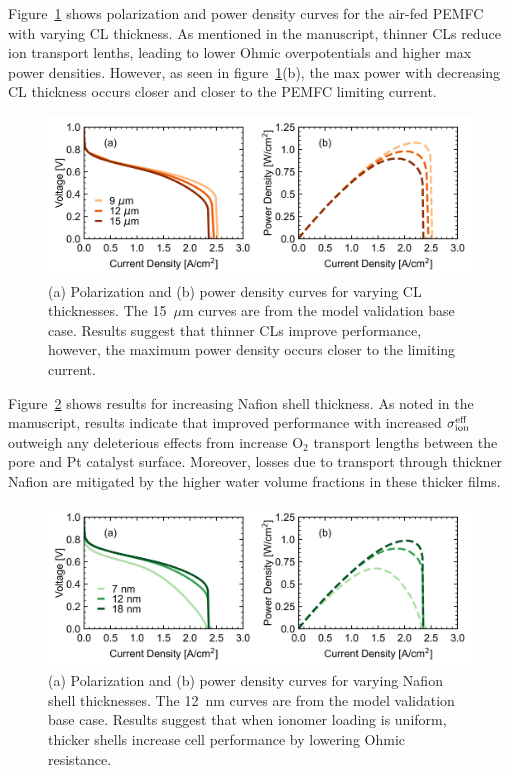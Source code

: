 \documentclass[final,3p,times,onecolumn]{elsarticle}    %
\begin{document}
Figure~\ref{fig:CL-thickness-study} shows polarization and power density curves for the air-fed PEMFC with varying CL thickness.  As mentioned in the manuscript, thinner CLs reduce ion transport lenths, leading to lower Ohmic overpotentials and higher max power densities.  However, as seen in figure~\ref{fig:CL-thickness-study}(b), the max power with decreasing CL thickness occurs closer and closer to the PEMFC limiting current.
\begin{figure}[H]
    \centering
    \includegraphics[width=5.718in]{figures/CL-thickness-5_718in.png}
    \caption{(a) Polarization and (b) power density curves for varying CL thicknesses. The 15~$\mu$m curves are from the model validation base case. Results suggest that thinner CLs improve performance, however, the maximum power density occurs closer to the limiting current.}
    \label{fig:CL-thickness-study}
\end{figure}
Figure~\ref{fig:naf-thickness-study} shows results for increasing Nafion shell thickness.  As noted in the manuscript, results indicate that improved performance with increased $\sigma_{\rm ion}^{\rm eff}$ outweigh any deleterious effects from increase O$_2$ transport lengths between the pore and Pt catalyst surface.  Moreover, losses due to transport through thickner Nafion are mitigated by the higher water volume fractions in these thicker films.
\begin{figure}[H]
    \centering
    \includegraphics[width=5.718in]{figures/naf-thickness-5_718in.png}
    \caption{(a) Polarization and (b) power density curves for varying Nafion shell thicknesses. The 12~nm curves are from the model validation base case. Results suggest that when ionomer loading is uniform, thicker shells increase cell performance by lowering Ohmic resistance.}
    \label{fig:naf-thickness-study}
\end{figure}
\end{document}
